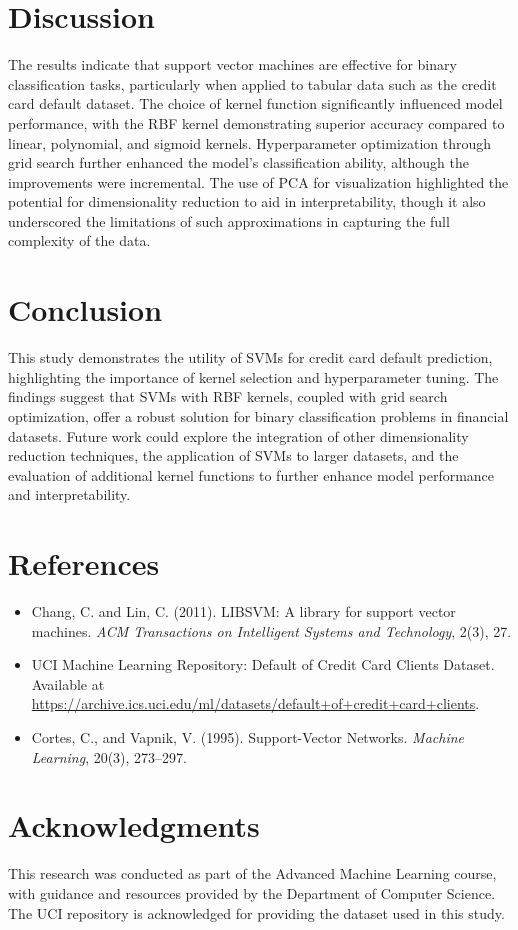 \documentclass{article}  %
\begin{document}
\section{Discussion}
The results indicate that support vector machines are effective for binary classification tasks, particularly when applied to tabular data such as the credit card default dataset. The choice of kernel function significantly influenced model performance, with the RBF kernel demonstrating superior accuracy compared to linear, polynomial, and sigmoid kernels. Hyperparameter optimization through grid search further enhanced the model's classification ability, although the improvements were incremental. The use of PCA for visualization highlighted the potential for dimensionality reduction to aid in interpretability, though it also underscored the limitations of such approximations in capturing the full complexity of the data.

\section{Conclusion}
This study demonstrates the utility of SVMs for credit card default prediction, highlighting the importance of kernel selection and hyperparameter tuning. The findings suggest that SVMs with RBF kernels, coupled with grid search optimization, offer a robust solution for binary classification problems in financial datasets. Future work could explore the integration of other dimensionality reduction techniques, the application of SVMs to larger datasets, and the evaluation of additional kernel functions to further enhance model performance and interpretability.

\section*{References}
\begin{itemize}
    \item Chang, C. and Lin, C. (2011). LIBSVM: A library for support vector machines. \textit{ACM Transactions on Intelligent Systems and Technology}, 2(3), 27.
    \item UCI Machine Learning Repository: Default of Credit Card Clients Dataset. Available at \url{https://archive.ics.uci.edu/ml/datasets/default+of+credit+card+clients}.
    \item Cortes, C., and Vapnik, V. (1995). Support-Vector Networks. \textit{Machine Learning}, 20(3), 273–297.
\end{itemize}

\section*{Acknowledgments}
This research was conducted as part of the Advanced Machine Learning course, with guidance and resources provided by the Department of Computer Science. The UCI repository is acknowledged for providing the dataset used in this study.
\end{document}
